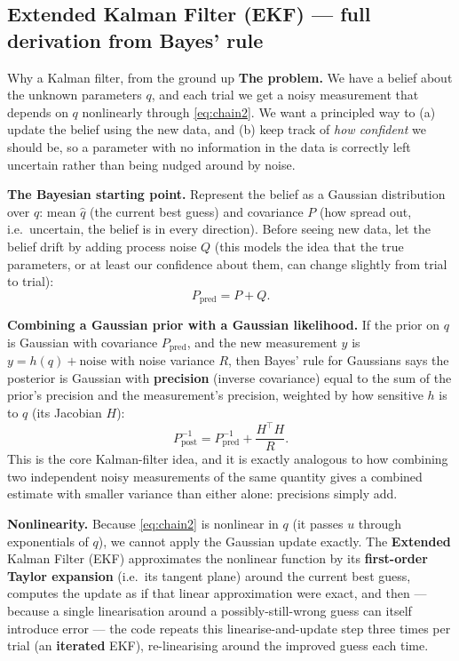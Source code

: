 \documentclass[11pt,a4paper]{article}
\begin{document}
\subsection{Extended Kalman Filter (EKF) --- full derivation from Bayes' rule}
\label{sec:ekf}

\begin{techbox}{Why a Kalman filter, from the ground up}
\textbf{The problem.} We have a belief about the unknown parameters $q$, and
each trial we get a noisy measurement that depends on $q$ nonlinearly through
\eqref{eq:chain2}. We want a principled way to (a) update the belief using the
new data, and (b) keep track of \emph{how confident} we should be, so a
parameter with no information in the data is correctly left uncertain rather
than being nudged around by noise.

\textbf{The Bayesian starting point.} Represent the belief as a Gaussian
distribution over $q$: mean $\hat q$ (the current best guess) and covariance
$P$ (how spread out, i.e.\ uncertain, the belief is in every direction).
Before seeing new data, let the belief drift by adding process noise $Q$ (this
models the idea that the true parameters, or at least our confidence about
them, can change slightly from trial to trial):
\[
P_{\mathrm{pred}} = P + Q.
\]

\textbf{Combining a Gaussian prior with a Gaussian likelihood.} If the prior
on $q$ is Gaussian with covariance $P_{\mathrm{pred}}$, and the new
measurement $y$ is $y=h(q)+\text{noise}$ with noise variance $R$, then Bayes'
rule for Gaussians says the posterior is Gaussian with \textbf{precision}
(inverse covariance) equal to the sum of the prior's precision and the
measurement's precision, weighted by how sensitive $h$ is to $q$ (its
Jacobian $H$):
\[
P_{\mathrm{post}}^{-1} = P_{\mathrm{pred}}^{-1} + \frac{H^\top H}{R}.
\]
This is the core Kalman-filter idea, and it is exactly analogous to how
combining two independent noisy measurements of the same quantity gives a
combined estimate with smaller variance than either alone: precisions simply
add.

\textbf{Nonlinearity.} Because \eqref{eq:chain2} is nonlinear in $q$
(it passes $u$ through exponentials of $q$), we cannot apply the Gaussian
update exactly. The \textbf{Extended} Kalman Filter (EKF) approximates the
nonlinear function by its \textbf{first-order Taylor expansion} (i.e.\ its
tangent plane) around the current best guess, computes the update as if that
linear approximation were exact, and then --- because a single linearisation
around a possibly-still-wrong guess can itself introduce error --- the code
repeats this linearise-and-update step three times per trial (an
\textbf{iterated} EKF), re-linearising around the improved guess each time.
\end{techbox}
\end{document}
